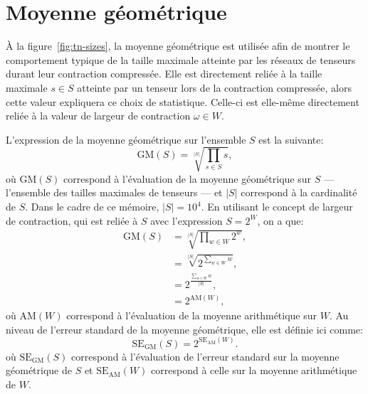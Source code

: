 \begin{comment}
\end{comment}

\appendix
\renewcommand\chapterstring{Annexe}
\chapter{Moyenne géométrique}\label{annexe:geo-mean}

À la figure~\ref{fig:tn-sizes}, la moyenne géométrique est utilisée afin de montrer le comportement typique de la taille maximale atteinte par les réseaux de tenseurs durant leur contraction compressée.
Elle est directement reliée à la taille maximale $s \in S$ atteinte par un tenseur lors de la contraction compressée, alors cette valeur expliquera ce choix de statistique.
Celle-ci est elle-même directement reliée à la valeur de largeur de contraction $\omega \in W$.

L'expression de la moyenne géométrique sur l'ensemble $S$ est la suivante:
\begin{equation}\label{eq:geo_mean}
    \mathrm{GM}(S) = \sqrt[|S|]{\prod_{s \in S} s},
\end{equation}
où $\mathrm{GM}(S)$ correspond à l'évaluation de la moyenne géométrique sur $S$ --- l'ensemble des tailles maximales de tenseurs --- et $|S|$ correspond à la cardinalité de $S$.
Dans le cadre de ce mémoire, $|S| = 10^4$.
En utilisant le concept de largeur de contraction, qui est reliée à $S$ avec l'expression $S = 2^W$, on a que:
\begin{equation}\label{eq:GM}
    \begin{split}
        \mathrm{GM}(S) &= \sqrt[|S|]{\prod_{w \in W} 2^{w}},\\
        &= \sqrt[|S|]{2^{\sum_{w \in W} w}},\\
        &= 2^\frac{\sum_{w \in W} w}{|S|},\\
        &= 2^{\mathrm{AM}(W)},
    \end{split}
\end{equation}
où $\mathrm{AM}(W)$ correspond à l'évaluation de la moyenne arithmétique sur $W$.
Au niveau de l'erreur standard de la moyenne géométrique, elle est définie ici comme:
\begin{equation}\label{eq:standard_error_geo_mean}
    \mathrm{SE}_\mathrm{GM}(S) = 2^{\mathrm{SE}_\mathrm{AM}(W)}.
\end{equation}
où $\mathrm{SE}_\mathrm{GM}(S)$ correspond à l'évaluation de l'erreur standard sur la moyenne géométrique de $S$ et $\mathrm{SE}_\mathrm{AM}(W)$ correspond à celle sur la moyenne arithmétique de $W$.

